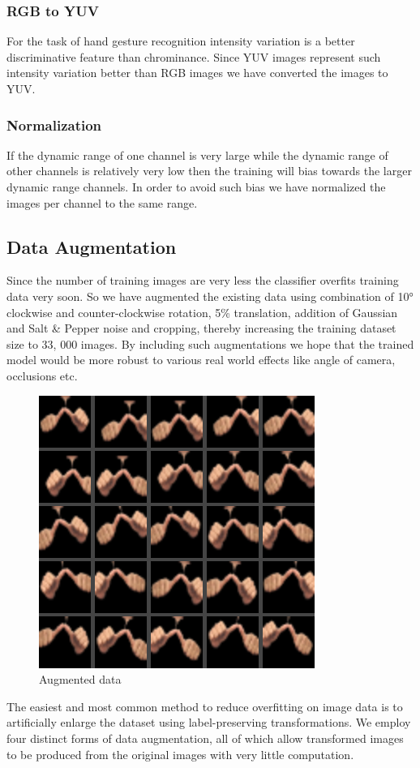 \documentclass[conference]{IEEEtran}
\begin{document}
\subsubsection{RGB to YUV}
For the task of hand gesture recognition intensity variation is a better discriminative feature than chrominance. Since YUV images represent such intensity variation better than RGB images we have converted the images to YUV.

\subsubsection{Normalization}
If the dynamic range of one channel is very large while the dynamic range of other channels is relatively very low then the training will bias towards the larger dynamic range channels. In order to avoid such bias we have normalized the images per channel to the same range.

\subsection{Data Augmentation}
Since the number of training images are very less the classifier overfits training data very soon. So we have augmented the existing data using combination of 10° clockwise and counter-clockwise rotation, 5\% translation, addition of Gaussian and Salt \& Pepper noise and cropping, thereby increasing the training dataset size to 33, 000 images. By including such augmentations we hope that the trained model would be more robust to various real world effects like angle of camera, occlusions etc.\\
\begin{figure}[h]
\includegraphics[width=9cm]{augmentedimages}
\caption{Augmented data}
\end{figure}
The easiest and most common method to reduce overfitting on image data is to artificially enlarge the dataset using label-preserving transformations. We employ four distinct forms of data augmentation, all of which allow transformed images to be produced from the original images with very little computation.
\end{document}
